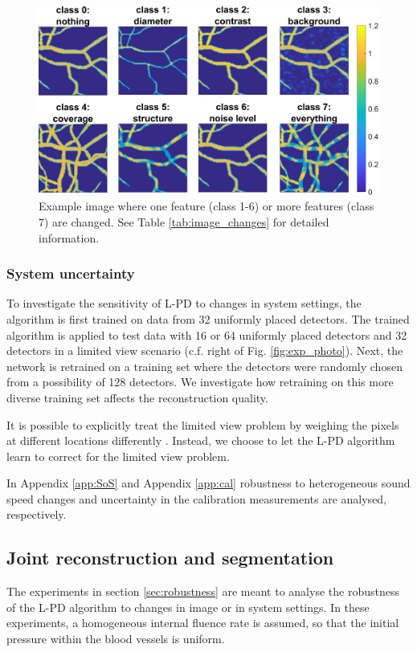 \documentclass[journal]{IEEEtran}
\begin{document}
\begin{figure}[!ht]
\centering
\includegraphics[width=\linewidth]{images/image_changes.png}
\caption{Example image where one feature (class 1-6) or more features (class 7) are changed. See Table \ref{tab:image_changes} for detailed information.}
\label{fig:image_changes}
\end{figure}

\subsubsection{System uncertainty}\label{sec:system_uncertainty}
To investigate the sensitivity of L-PD to changes in system settings, the algorithm is first trained on data from 32 uniformly placed detectors. The trained algorithm is applied to test data with 16 or 64 uniformly placed detectors and 32 detectors in a limited view scenario {(c.f. right of Fig. \ref{fig:exp_photo})}. Next, the network is retrained on a training set where the detectors were randomly chosen from a possibility of 128 detectors. We investigate how retraining on this more diverse training set affects the reconstruction quality. {It is possible to explicitly treat the limited view problem by weighing the pixels at different locations differently \cite{Paltauf2007,Schwab2018}. Instead, we choose to let the L-PD algorithm learn to correct for the limited view problem.

In Appendix \ref{app:SoS} and Appendix \ref{app:cal} robustness to heterogeneous sound speed changes and uncertainty in the calibration measurements are analysed, respectively.}

\subsection{Joint reconstruction and segmentation}\label{sec:segmentation}
The experiments in section \ref{sec:robustness} are meant to analyse the robustness of the L-PD algorithm to changes in image or in system settings. In these experiments, a homogeneous internal fluence rate is assumed, so that the initial pressure within the blood vessels is uniform. 
\end{document}
